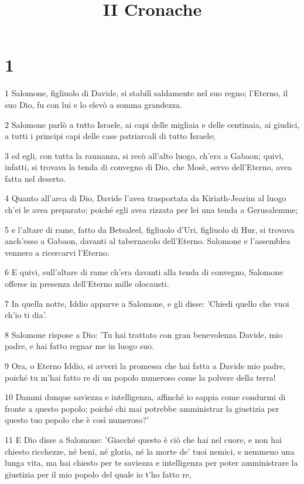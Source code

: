 

\title{II Cronache}


\chapter{1}

\par 1 Salomone, figliuolo di Davide, si stabilì saldamente nel suo regno; l'Eterno, il suo Dio, fu con lui e lo elevò a somma grandezza.
\par 2 Salomone parlò a tutto Israele, ai capi delle migliaia e delle centinaia, ai giudici, a tutti i principi capi delle case patriarcali di tutto Israele;
\par 3 ed egli, con tutta la raunanza, si recò all'alto luogo, ch'era a Gabaon; quivi, infatti, si trovava la tenda di convegno di Dio, che Mosè, servo dell'Eterno, avea fatta nel deserto.
\par 4 Quanto all'arca di Dio, Davide l'avea trasportata da Kiriath-Jearim al luogo ch'ei le avea preparato; poiché egli avea rizzata per lei una tenda a Gerusalemme;
\par 5 e l'altare di rame, fatto da Betsaleel, figliuolo d'Uri, figliuolo di Hur, si trovava anch'esso a Gabaon, davanti al tabernacolo dell'Eterno. Salomone e l'assemblea vennero a ricercarvi l'Eterno.
\par 6 E quivi, sull'altare di rame ch'era davanti alla tenda di convegno, Salomone offerse in presenza dell'Eterno mille olocausti.
\par 7 In quella notte, Iddio apparve a Salomone, e gli disse: 'Chiedi quello che vuoi ch'io ti dia'.
\par 8 Salomone rispose a Dio: 'Tu hai trattato con gran benevolenza Davide, mio padre, e hai fatto regnar me in luogo suo.
\par 9 Ora, o Eterno Iddio, si avveri la promessa che hai fatta a Davide mio padre, poiché tu m'hai fatto re di un popolo numeroso come la polvere della terra!
\par 10 Dammi dunque saviezza e intelligenza, affinché io sappia come condurmi di fronte a questo popolo; poiché chi mai potrebbe amministrar la giustizia per questo tuo popolo che è così numeroso?'
\par 11 E Dio disse a Salomone: 'Giacché questo è ciò che hai nel cuore, e non hai chiesto ricchezze, né beni, né gloria, né la morte de' tuoi nemici, e nemmeno una lunga vita, ma hai chiesto per te saviezza e intelligenza per poter amministrare la giustizia per il mio popolo del quale io t'ho fatto re,

